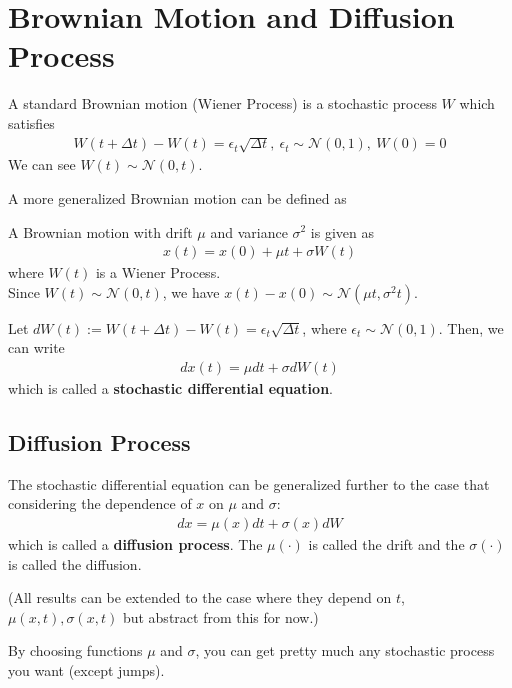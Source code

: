 \documentclass[11pt]{elegantbook}
\begin{document}
\section{Brownian Motion and Diffusion Process}
\begin{definition}
    A standard Brownian motion (Wiener Process) is a stochastic process $W$ which satisfies
    \begin{equation}
        \begin{aligned}
            W(t+\Delta t)-W(t)=\epsilon_t\sqrt{\Delta t},\ \epsilon_t\sim \mathcal{N}(0,1),\ W(0)=0
        \end{aligned}
        \nonumber
    \end{equation}
    We can see $W(t)\sim \mathcal{N}(0,t)$.
\end{definition}
A more generalized Brownian motion can be defined as
\begin{definition}
    A Brownian motion with drift $\mu$ and variance $\sigma^2$ is given as
    \begin{equation}
        \begin{aligned}
            x(t)=x(0)+ \mu t + \sigma W(t)
        \end{aligned}
        \nonumber
    \end{equation}
    where $W(t)$ is a Wiener Process.\\
    Since $W(t)\sim \mathcal{N}(0,t)$, we have $x(t)-x(0)\sim \mathcal{N}(\mu t,\sigma^2 t)$.
\end{definition}
Let $dW(t):=W(t+\Delta t)-W(t)=\epsilon_t\sqrt{\Delta t}$, where $\epsilon_t\sim \mathcal{N}(0,1)$. Then, we can write
\begin{equation}
    \begin{aligned}
        d x(t)= \mu dt + \sigma d W(t)
    \end{aligned}
    \nonumber
\end{equation}
which is called a \textbf{stochastic differential equation}.

\subsection{Diffusion Process}
\begin{definition}
    The stochastic differential equation can be generalized further to the case that considering the dependence of $x$ on $\mu$ and $\sigma$:
    \begin{equation}
        \begin{aligned}
            dx=\mu(x)dt+\sigma(x)dW
        \end{aligned}
        \nonumber
    \end{equation}
    which is called a \textbf{diffusion process}. The $\mu(\cdot)$ is called the drift and the $\sigma(\cdot)$ is called the diffusion.
\end{definition}
(All results can be extended to the case where they depend on $t$,
$\mu(x, t), \sigma(x, t)$ but abstract from this for now.)
\begin{note}
    By choosing functions $\mu$ and $\sigma$, you can get pretty much any stochastic process you want (except jumps).
\end{note}
\end{document}
